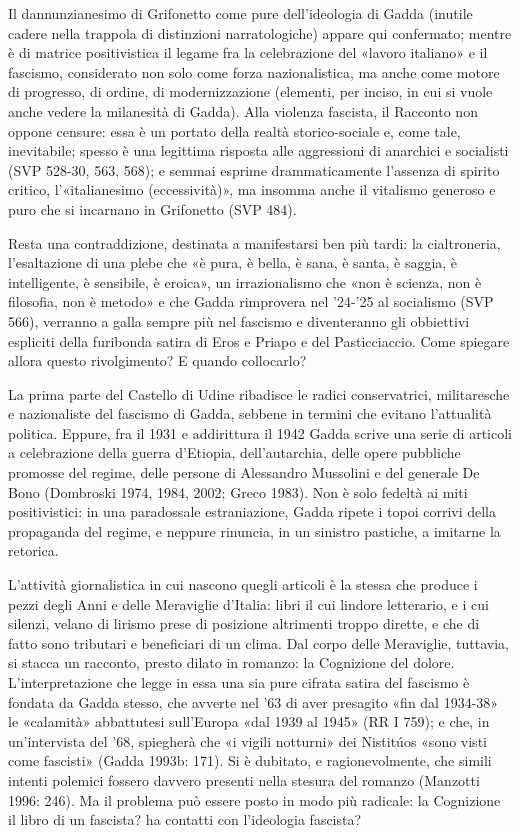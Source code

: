 Il dannunzianesimo di Grifonetto come pure dell’ideologia di Gadda (inutile cadere nella trappola di distinzioni narratologiche) appare qui confermato; mentre è di matrice positivistica il legame fra la celebrazione del «lavoro italiano» e il fascismo, considerato non solo come forza nazionalistica, ma anche come motore di progresso, di ordine, di modernizzazione (elementi, per inciso, in cui si vuole anche vedere la milanesità di Gadda). Alla violenza fascista, il Racconto non oppone censure: essa è un portato della realtà storico-sociale e, come tale, inevitabile; spesso è una legittima risposta alle aggressioni di anarchici e socialisti (SVP 528-30, 563, 568); e semmai esprime drammaticamente l’assenza di spirito critico, l’«italianesimo (eccessività)», ma insomma anche il vitalismo generoso e puro che si incarnano in Grifonetto (SVP 484).

Resta una contraddizione, destinata a manifestarsi ben più tardi: la cialtroneria, l’esaltazione di una plebe che «è pura, è bella, è sana, è santa, è saggia, è intelligente, è sensibile, è eroica», un irrazionalismo che «non è scienza, non è filosofia, non è metodo» e che Gadda rimprovera nel ’24-’25 al socialismo (SVP 566), verranno a galla sempre più nel fascismo e diventeranno gli obbiettivi espliciti della furibonda satira di Eros e Priapo e del Pasticciaccio. Come spiegare allora questo rivolgimento? E quando collocarlo?

La prima parte del Castello di Udine ribadisce le radici conservatrici, militaresche e nazionaliste del fascismo di Gadda, sebbene in termini che evitano l’attualità politica. Eppure, fra il 1931 e addirittura il 1942 Gadda scrive una serie di articoli a celebrazione della guerra d’Etiopia, dell’autarchia, delle opere pubbliche promosse del regime, delle persone di Alessandro Mussolini e del generale De Bono (Dombroski 1974, 1984, 2002; Greco 1983). Non è solo fedeltà ai miti positivistici: in una paradossale estraniazione, Gadda ripete i topoi corrivi della propaganda del regime, e neppure rinuncia, in un sinistro pastiche, a imitarne la retorica.

L’attività giornalistica in cui nascono quegli articoli è la stessa che produce i pezzi degli Anni e delle Meraviglie d’Italia: libri il cui lindore letterario, e i cui silenzi, velano di lirismo prese di posizione altrimenti troppo dirette, e che di fatto sono tributari e beneficiari di un clima. Dal corpo delle Meraviglie, tuttavia, si stacca un racconto, presto dilato in romanzo: la Cognizione del dolore. L’interpretazione che legge in essa una sia pure cifrata satira del fascismo è fondata da Gadda stesso, che avverte nel ’63 di aver presagito «fin dal 1934-38» le «calamità» abbattutesi sull’Europa «dal 1939 al 1945» (RR I 759); e che, in un’intervista del ’68, spiegherà che «i vigili notturni» dei Nistitúos «sono visti come fascisti» (Gadda 1993b: 171). Si è dubitato, e ragionevolmente, che simili intenti polemici fossero davvero presenti nella stesura del romanzo (Manzotti 1996: 246). Ma il problema può essere posto in modo più radicale: la Cognizione il libro di un fascista? ha contatti con l’ideologia fascista?

